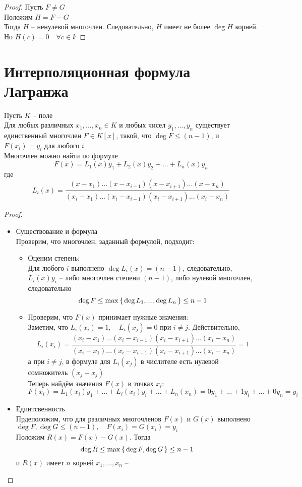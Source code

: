 \begin{proof}
	Пусть $F \ne G$ \\
	Положим $H = F - G$ \\
	Тогда $H$ -- ненулевой многочлен. Следовательно, $H$ имеет не более $\deg H$ корней. Но $H(c) = 0 \quad \forall c \in k$
\end{proof}

\section{Интерполяционная формула Лагранжа}

\begin{theorem}
	Пусть $K$ -- поле \\
	Для любых различных $x_1, ..., x_n \in K$ и любых чисел $y_1, ..., y_n$ существует единственный многочлен $F \in K[x]$, такой, что $\deg F \le (n - 1)$, и $F(x_i) = y_i $ для любого $i$ \\
	Многочлен можно найти по формуле
	$$ F(x) = L_1(x)y_1 + L_2(x)y_2 + ... + L_n(x)y_n $$
	где
	$$ L_i(x) = \frac{(x - x_1)...(x - x_{i - 1})(x - x_{i + 1})...(x - x_n)}{(x_i - x_1)...(x_i - x_{i - 1})(x_i - x_{i + 1})...(x_i - x_n)} $$
\end{theorem}

\begin{proof}
	\hfill
	\begin{itemize}
		\item Существование и формула \\
		Проверим, что многочлен, заданный формулой, подходит:
		\begin{itemize}
			\item Оценим степень: \\
			Для любого $i$ выполнено $\deg L_i(x) = (n - 1)$, следовательно, $L_i(x)y_i$ -- либо многочлен степени $(n - 1)$, либо нулевой многочлен, следовательно
			$$ \deg F \le \max \set{\deg L_1, ..., \deg L_n} \le n - 1 $$
			\item Проверим, что $F(x)$ принимает нужные значения: \\
			Заметим, что $L_i(x_i) = 1, \quad L_i(x_j) = 0$ при $i \ne j$. Действительно,
			$$ L_i(x_i) = \frac{(x_i - x_1)...(x_i - x_{i - 1})(x_i - x_{i + 1})...(x_i - x_n)}{(x_i - x_1)...(x_i - x_{i - 1})(x_i - x_{i + 1})...(x_i - x_n)} = 1 $$
			а при $i \ne j$, в формуле для $L_i(x_j)$ в числителе есть нулевой сомножитель $(x_j - x_j)$ \\
			Теперь найдём значения $F(x)$ в точках $x_i$:
			$$ F(x_i) = L_1(x_i)y_1 + ... + L_i(x_i)y_i + ... + L_n(x_n) = 0y_1 + ... + 1y_i + ... + 0y_n = y_i $$
		\end{itemize}
		\item Единтсвенность \\
		Прдеположим, что для различных многочленов $F(x)$ и $G(x)$ выполнено $\deg F, \deg G \le (n - 1), \quad F(x_i) = G(x_i) = y_i $ \\
		Положим $R(x) = F(x) - G(x)$. Тогда
		$$ \deg R \le \max \set{\deg F, \deg G} \le n - 1 $$
		и $R(x)$ имеет $n$ корней $x_1, ..., x_n$ -- \contra
	\end{itemize}
\end{proof}

